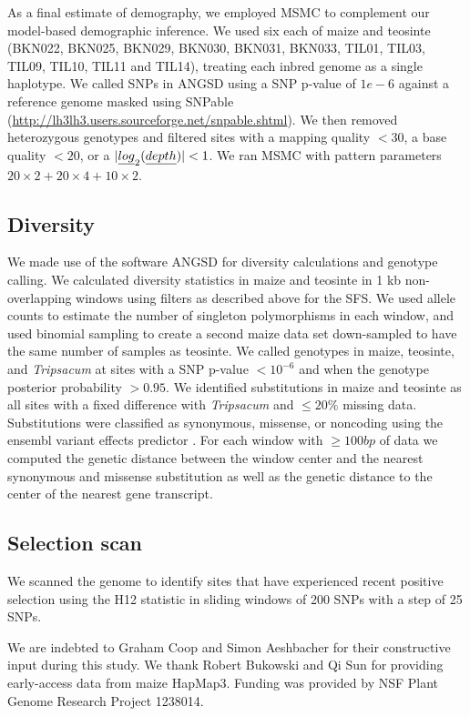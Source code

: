 \documentclass{pnastwo}
\begin{document}
\begin{article}
\begin{materials}
As a final estimate of demography, we employed MSMC \cite{schiffels2014}  to complement our model-based demographic inference. 
We used six each of maize and teosinte (BKN022, BKN025, BKN029, BKN030, BKN031, BKN033, TIL01, TIL03, TIL09, TIL10, TIL11 and TIL14), treating each inbred genome as a single haplotype.
We called SNPs in ANGSD \cite{korneliussen2014} using a SNP p-value of $1e-6$ against a reference genome masked using SNPable (\url{http://lh3lh3.users.sourceforge.net/snpable.shtml}).
We then removed heterozygous genotypes and filtered sites with a mapping quality $<30$, a base quality $<20$, or a $|\emph{log}_2(\emph{depth})|<1$.
We ran MSMC with pattern parameters $20\times2+20\times4+10\times2$.

\subsection{Diversity}
We made use of the software ANGSD \cite{korneliussen2014} for diversity calculations and genotype calling. 
We calculated diversity statistics in maize and teosinte in 1 kb non-overlapping windows using filters as described above for the SFS. 
We used allele counts to estimate the number of singleton polymorphisms in each window, and used binomial sampling to create a second maize data set down-sampled to have the same number of samples as teosinte.
We called genotypes in maize, teosinte, and \emph{Tripsacum} at sites with a SNP p-value $<10^{-6}$ and when the genotype posterior probability $>0.95$.
We identified substitutions in maize and teosinte as all sites with a fixed difference with \emph{Tripsacum} and $\leq 20\%$ missing data. 
Substitutions were classified as synonymous, missense, or noncoding using the ensembl variant effects predictor \cite{mclaren2010}.
For each window with $\geq 100bp$ of data we computed the genetic distance between the window center and the nearest synonymous and missense substitution as well as the genetic distance to the center of the nearest gene transcript.  

\subsection{Selection scan}
We scanned the genome to identify sites that have experienced recent positive selection using the H12 statistic \cite{garud2015} in sliding windows of 200 SNPs with a step of 25 SNPs.

\end{materials}

\begin{acknowledgments}
We are indebted to Graham Coop and Simon Aeshbacher for their constructive input during this study. We thank Robert Bukowski and Qi Sun for providing early-access data from maize HapMap3. Funding was provided by NSF Plant Genome Research Project 1238014.
\end{acknowledgments}



\onecolumn
 


\end{article}
\end{document}
